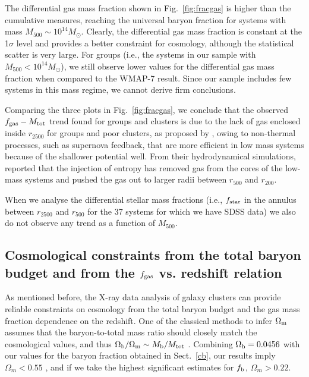\documentclass{aa}
\begin{document}
The differential gas mass fraction shown in Fig.~\ref{fig:fracgas} 
is higher than the cumulative measures, reaching the
universal baryon fraction for systems with mass $M_{500} \sim 10^{14} M_{\odot}$.
Clearly, the differential gas mass fraction is constant at the
1$\sigma$ level and provides a better
constraint for cosmology, although the statistical scatter is very large.
For groups (i.e., the systems in our sample with $M_{500} < 10^{14} M_{\odot}$),
we still observe lower values for the differential gas mass fraction 
when compared to the WMAP-7 result. Since our sample includes few systems in this 
mass regime, we cannot derive
firm conclusions.

Comparing the three plots in Fig.~\ref{fig:fracgas}, we conclude that the
observed $f_{\rm gas}-M_{\rm tot}$ trend found for
groups and clusters is due to the lack of gas enclosed inside $r_{2500}$ for groups and poor clusters, 
as proposed by \citet{sun12}, owing to non-thermal processes,
such as supernova feedback, that are more efficient in low mass
systems because of the shallower potential well. From their hydrodynamical simulations, 
\citet{young11} reported that 
the injection of entropy has removed gas from the cores of the low-mass systems and pushed
the gas out to larger radii between $r_{500}$ and $r_{200}$.

When we analyse the differential stellar mass fractions (i.e.,
$f_{\rm star}$ in the annulus between $r_{2500}$ and $r_{500}$ for the
37 systems for which we have SDSS data) we also do not observe any trend as
a function of $M_{500}$.


\subsection{Cosmological constraints from the total baryon budget and from the $f_{\rm gas}$ vs. redshift relation}
\label{cosm}

As mentioned before, the X-ray data analysis of galaxy
  clusters can provide reliable constraints on cosmology from the total
  baryon budget and the gas mass fraction dependence on the redshift.
  One of the classical methods to infer $\Omega_{\rm m}$ 
  assumes that the  baryon-to-total mass ratio should closely match
  the cosmological values, and thus $\Omega_{\rm b}/\Omega_{\rm m}
  \sim M_{\rm b}/M_{\rm tot}$ \citep{white93,evrard97}. 
Combining $\Omega_{\rm b} = 0.0456$ \citep{jarosik11}
 with our values for the baryon fraction obtained in Sect.~\ref{cb}, 
 our results imply $\Omega_{m} < 0.55$
  \citep[assuming the lowest $f_{\rm b}$ value and agreeing with][]{ettori99}, 
  and if we take the highest
  significant estimates for $f_{\rm b}$, $\Omega_{m} > 0.22$.
\end{document}
